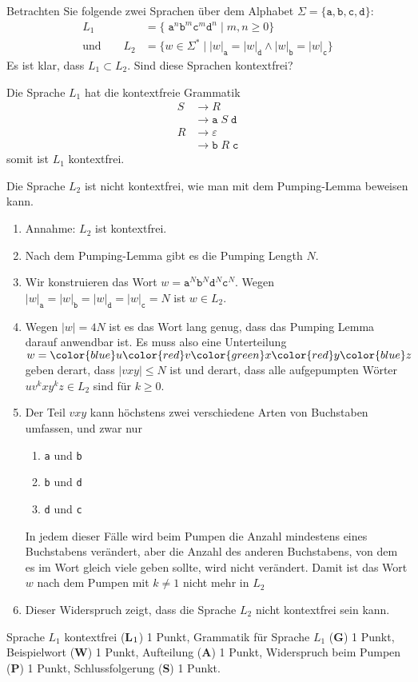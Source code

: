 Betrachten Sie folgende zwei Sprachen über dem Alphabet $\Sigma = \{
\texttt{a},
\texttt{b},
\texttt{c},
\texttt{d}\}$:
\begin{align*}
L_1&=\{\;\texttt{a}^n\texttt{b}^m\texttt{c}^m\texttt{d}^n
\mid
m,n\ge 0\}
\\
\text{und}
\qquad
L_2&=\{w\in\Sigma^*
\mid
|w|_{\texttt{a}} = |w|_{\texttt{d}}
\wedge
|w|_{\texttt{b}} = |w|_{\texttt{c}}
\}
\end{align*}
Es ist klar, dass $L_1\subset L_2$.
Sind diese Sprachen kontextfrei?


\begin{loesung}
Die Sprache $L_1$ hat die kontextfreie Grammatik
\begin{align*}
S&\to R                             \\
 &\to \texttt{a}\;S\;\texttt{d}     \\
R&\to\varepsilon                    \\
 &\to\texttt{b}\;R\;\texttt{c}
\end{align*}
somit ist $L_1$ kontextfrei.

Die Sprache $L_2$ ist nicht kontextfrei, wie man mit dem Pumping-Lemma
beweisen kann.
\begin{enumerate}
\item
Annahme: $L_2$ ist kontextfrei.
\item
Nach dem Pumping-Lemma gibt es die Pumping Length $N$.
\item
Wir konstruieren das Wort
$w=
\texttt{a}^N
\texttt{b}^N
\texttt{d}^N
\texttt{c}^N$.
Wegen $
|w|_{\texttt{a}}
=
|w|_{\texttt{b}}
=
|w|_{\texttt{d}}
=
|w|_{\texttt{c}}
=N$ ist $w\in L_2$.
\item
Wegen $|w|=4N$ ist es das Wort lang genug, dass das Pumping Lemma darauf
anwendbar ist.
Es muss also eine Unterteilung $w=
{\color{blue}u}
{\color{red}v}
{\color{green}x}
{\color{red}y}
{\color{blue}z}
$ geben derart, dass $|vxy|\le N$ ist und derart, dass alle aufgepumpten
Wörter $uv^kxy^kz\in L_2$ sind für $k\ge 0$.
\item
Der Teil $vxy$ kann höchstens zwei verschiedene Arten von Buchstaben umfassen,
und zwar nur
\begin{enumerate}
\item
\texttt{a} und \texttt{b}
\item
\texttt{b} und \texttt{d}
\item
\texttt{d} und \texttt{c}
\end{enumerate}
In jedem dieser Fälle wird beim Pumpen die Anzahl mindestens eines Buchstabens
verändert,
aber die Anzahl des anderen Buchstabens, von dem es im Wort gleich
viele geben sollte, wird nicht verändert.
Damit ist das Wort $w$ nach dem Pumpen mit $k\ne 1$ nicht mehr in $L_2$
\item
Dieser Widerspruch zeigt, dass die Sprache $L_2$ nicht kontextfrei sein kann.
\qedhere
\end{enumerate}
\end{loesung}

\begin{bewertung}
Sprache $L_1$ kontextfrei ({\bf L}$\mathstrut_1$) 1 Punkt,
Grammatik für Sprache $L_1$ ({\bf G}) 1 Punkt,
Beispielwort ({\bf W}) 1 Punkt,
Aufteilung ({\bf A}) 1 Punkt,
Widerspruch beim Pumpen ({\bf P}) 1 Punkt,
Schlussfolgerung ({\bf S}) 1 Punkt.
\end{bewertung}


